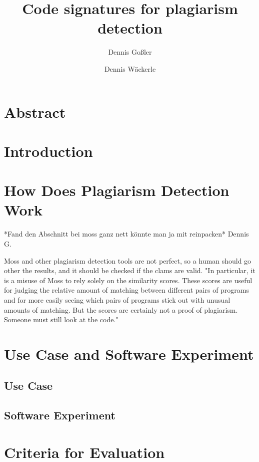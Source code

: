 \documentclass[a4paper, 11pt]{article}
\renewcommand{\\}{\vspace*{0.5\baselineskip} \newline}
\begin{document}
\title{Code signatures for plagiarism detection}
\author{Dennis Goßler \and Dennis Wäckerle}
\maketitle

\section*{Abstract}
\newpage
\tableofcontents
\newpage

\section{Introduction}

\section{How Does Plagiarism Detection Work}


*Fand den Abschnitt bei moss ganz nett könnte man ja mit reinpacken* Dennis G.

Moss and other plagiarism detection tools are not perfect, so a human should go other the results, and it should be checked if the clams are valid.
"In particular, it is a misuse of Moss to rely solely on the similarity scores. These scores are useful for judging the relative amount of matching between different pairs of programs and for more easily seeing which pairs of programs stick out with unusual amounts of matching. But the scores are certainly not a proof of plagiarism. Someone must still look at the code."
\autocite{SMOSS}

\section{Use Case and Software Experiment}

\subsection{Use Case}

\subsection{Software Experiment}

\section{Criteria for Evaluation}
\end{document}
